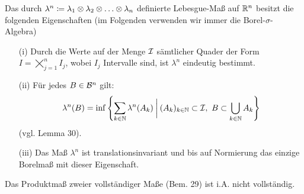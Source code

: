 \documentclass[skript.tex]{subfiles}
\begin{document}
	\begin{theorem}
		Das durch $\lambda^n \coloneqq \lambda_1 \otimes \lambda_2 \otimes \dotsc \otimes \lambda_n$ definierte Lebesgue-Maß auf $\mathbb{R}^n$ besitzt die folgenden Eigenschaften (im Folgenden verwenden wir immer die Borel-$\sigma$-Algebra)
		\begin{itemize}
			\item[(i)] Durch die Werte auf der Menge $\mathcal{I}$ sämtlicher Quader der Form $I=\mathop{\bigtimes}_{j=1}^{n} I_j$, wobei $I_j$ Intervalle sind, ist $\lambda^n$ eindeutig bestimmt. 
			
			\item[(ii)] Für jedes $B \in \mathcal{B}^n$ gilt:
				\[
				\lambda^n(B) = \inf \left\{\sum_{k\in\mathbb{N}} \lambda^n(A_k) \: \bigg| \: (A_k)_{k\in\mathbb{N}} \subset \mathcal{I},\ B \subset \bigcup_{k\in\mathbb{N}} A_k\right\}
				\]
			(vgl. \textup{Lemma 30}).
			
			\item[(iii)] Das Maß $\lambda^n$ ist translationsinvariant und bis auf Normierung das einzige Borelmaß mit dieser Eigenschaft.
		\end{itemize}
	\end{theorem}
	
	\begin{bem*}
		Das Produktmaß zweier vollständiger Maße (\textup{Bem. 29}) ist i.A. nicht vollständig. 
	\end{bem*}
\end{document}
